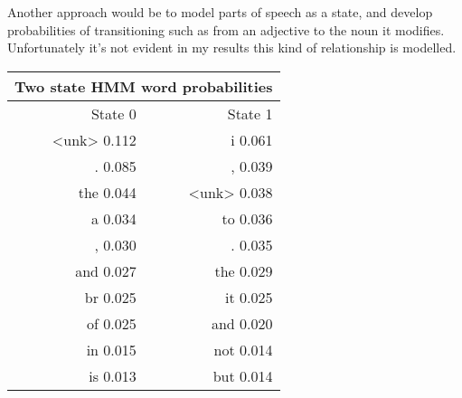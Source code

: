 Another approach would be to model parts of speech as a state, and develop probabilities of transitioning such as from an adjective to the noun it modifies. Unfortunately it's not evident in my results this kind of relationship is modelled.

\begin{center}

    \begin{tabular}{ |r|r| }

        \hline
        \multicolumn{2}{|c|}{Two state HMM word probabilities} \\
        \hline
        State 0     & State 1                                  \\
        \hline
        <unk> 0.112 & i     0.061                              \\
        .     0.085 & ,     0.039                              \\
        the   0.044 & <unk> 0.038                              \\
        a     0.034 & to    0.036                              \\
        ,     0.030 & .     0.035                              \\
        and   0.027 & the   0.029                              \\
        br    0.025 & it    0.025                              \\
        of    0.025 & and   0.020                              \\
        in    0.015 & not   0.014                              \\
        is    0.013 & but   0.014                              \\
        \hline
    \end{tabular}
\end{center}

